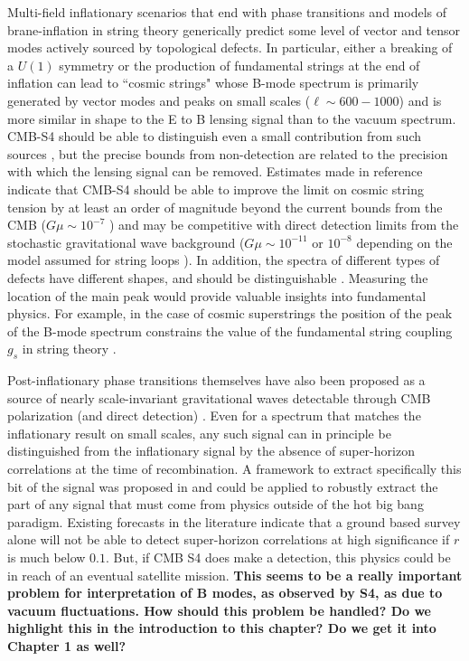 Multi-field inflationary scenarios that end with phase transitions \cite{Hindmarsh:1994re,Vilenkin:1981iu,Kofman:1995fi,Tkachev:1998dc,Jeannerot:1995yn,Jeannerot:2003qv,Rocher:2004my} and models of brane-inflation in string theory \cite{Sarangi:2002yt,Jones:2003da,Copeland:2003bj} generically predict some level of vector and tensor modes actively sourced by topological defects. In particular, either a breaking of a $U(1)$ symmetry or the production of fundamental strings at the end of inflation can lead to ``cosmic strings" whose B-mode spectrum is primarily generated by vector modes and peaks on small scales ($\ell\sim 600 - 1000$) and is more similar in shape to the E to B lensing signal than to the vacuum spectrum. CMB-S4 should be able to distinguish even a small contribution from such sources \cite{Urrestilla:2008jv}, but the precise bounds from non-detection are related to the precision with which the lensing signal can be removed. Estimates made in reference \cite{Seljak:2006hi,Avgoustidis:2011ax} indicate that CMB-S4 should be able to improve the limit on cosmic string tension by at least an order of magnitude beyond the current bounds from the CMB ($G\mu\sim10^{-7}$ \cite{Ade:2015ava,Ade:2013xla}) and may be competitive with direct detection limits from the stochastic gravitational wave background ($G\mu\sim10^{-11}$ or $10^{-8}$ depending on the model assumed for string loops \cite{Arzoumanian:2015liz}). In addition, the spectra of different types of defects have different shapes, and should be distinguishable \cite{Urrestilla:2007sf,Avgoustidis:2011ax}. Measuring the location of the main peak would provide valuable insights into fundamental physics. For example, in the case of cosmic superstrings the position of the peak of the B-mode spectrum constrains the value of the fundamental string coupling $g_s$ in string theory \cite{Avgoustidis:2011ax}. 

Post-inflationary phase transitions themselves have also been proposed as a source of nearly scale-invariant gravitational waves detectable through CMB polarization (and direct detection) \cite{Krauss:1991qu,JonesSmith:2007ne}. Even for a spectrum that matches the inflationary result on small scales, any such signal can in principle be distinguished from the inflationary signal by the absence of super-horizon correlations at the time of recombination. A framework to extract specifically this bit of the signal was proposed in \cite{Baumann:2009mq} and could be applied to robustly extract the part of any signal that must come from physics outside of the hot big bang paradigm. Existing forecasts in the literature \cite{Lee:2014cya} indicate that a ground based survey alone will not be able to detect super-horizon correlations at high significance if $r$ is much below $0.1$. But, if CMB S4 does make a detection, this physics could be in reach of an eventual satellite mission. {\bf This seems to be a really important problem for interpretation of B modes, as observed by S4, as due to vacuum fluctuations. How should this problem be handled? Do we highlight this in the introduction to this chapter? Do we get it into Chapter 1 as well?}


